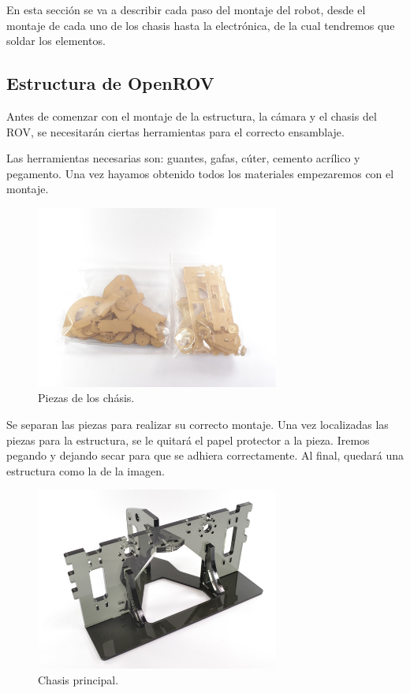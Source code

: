 En esta sección se va a describir cada paso del montaje del robot, desde el montaje de cada uno de los chasis hasta la electrónica, de la cual tendremos que soldar los elementos.

\subsection{Estructura de OpenROV}
\label{subsec:EstructuraOpenROV}

Antes de comenzar con el montaje de la estructura, la cámara y el chasis del ROV, se necesitarán ciertas herramientas para el correcto ensamblaje.

Las herramientas necesarias son: guantes, gafas, cúter, cemento acrílico y pegamento. Una vez hayamos obtenido todos los materiales empezaremos con el montaje.

\begin{figure} [hbtp]
  \begin{center}
    \includegraphics[width=8cm]{img/cap3/3_3/piezas}
  \end{center}
  \caption{Piezas de los chásis.}
  \label{fig:piezas}
\end{figure}

Se separan las piezas para realizar su correcto montaje. Una vez localizadas las piezas para la estructura, se le quitará el papel protector a la pieza. 
Iremos pegando y dejando secar para que se adhiera correctamente. 
Al final, quedará una estructura como la de la imagen.

\begin{figure} [hbtp]
  \begin{center}
    \includegraphics[width=8cm]{img/cap3/3_3/chasis_ppal}
  \end{center}
  \caption{Chasis principal.}
  \label{fig:chasis_ppal}
\end{figure}

